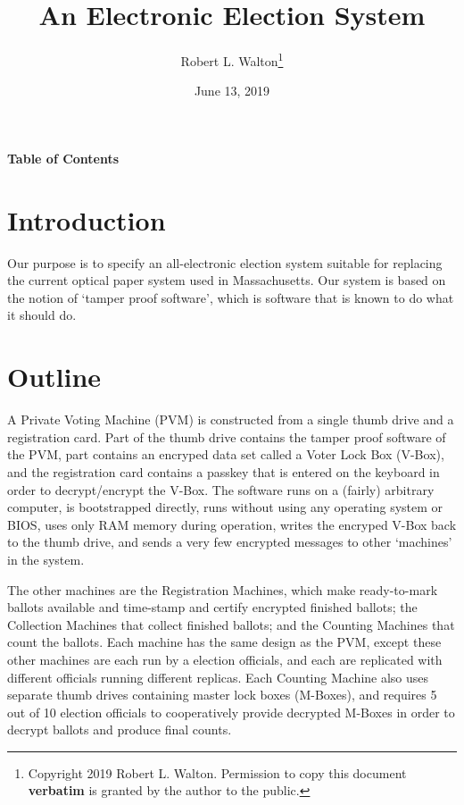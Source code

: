 \documentclass[12pt]{article}
\makeatletter
\renewcommand\tableofcontents{%
    \begin{list}{}%
	     {\setlength{\itemsep}{0in}%
	      \setlength{\topsep}{0in}%
	      \setlength{\parsep}{1ex}%
	      \setlength{\labelwidth}{0in}%
	      \setlength{\baselineskip}{1.5ex}%
	      \setlength{\leftmargin}{0.8in}%
	      \setlength{\rightmargin}{0.8in}}%
    \item\@starttoc{toc}%
    \end{list}}
\makeatother
\begin{document}
        
\title{An Electronic Election System}

\author{Robert L. Walton\thanks{Copyright 2019 Robert L. Walton.
Permission to copy this document {\bf verbatim} is granted by the author
to the public.}}

\date{June 13, 2019}

\maketitle

\begin{center}
\large \bf Table of Contents
\end{center}

\bigskip

\tableofcontents 

\newpage

\section{Introduction}

Our purpose is to specify an all-electronic election system
suitable for replacing the current optical paper system
used in Massachusetts.  Our system is based on the notion
of `tamper proof software', which is software that is
known to do what it should do.

\section{Outline}

A Private Voting Machine
(PVM) is constructed from a single thumb drive and a
registration card.  Part of the thumb drive contains the
tamper proof software of the PVM, part contains an encryped
data set called a Voter Lock Box (V-Box), and the registration
card contains a passkey that is entered on the keyboard in
order to decrypt/encrypt the V-Box.  The software runs on
a (fairly) arbitrary computer, is bootstrapped directly,
runs without using any operating system or BIOS,
uses only RAM memory during operation,
writes the encryped V-Box back to the thumb drive, and sends
a very few encrypted messages to other `machines' in the
system.

The other machines are the Registration Machines, which make
ready-to-mark ballots available and time-stamp and certify
encrypted finished ballots; the Collection Machines that collect
finished ballots; and the Counting Machines that count the
ballots.  Each machine has the same design as the PVM, except
these other machines are each run by a election officials, and
each are replicated with different officials running different
replicas.  Each Counting Machine also uses separate
thumb drives containing master lock boxes
(M-Boxes), and requires 5 out of 10 election officials to cooperatively
provide decrypted M-Boxes in order to decrypt ballots and
produce final counts.
\end{document}
